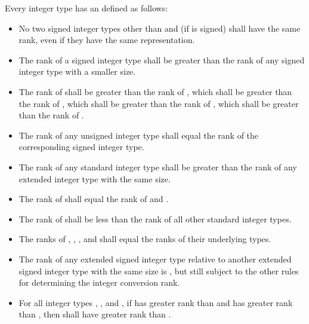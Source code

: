 \pnum
Every integer type has an  defined as follows:

\begin{itemize}
\item No two signed integer types other than  and  (if  is signed) shall have the same rank, even if they have
the same representation.

\item The rank of a signed integer type shall be greater than the rank
of any signed integer type with a smaller size.

\item The rank of  shall be greater
than the rank of , which shall be greater than
the rank of , which shall be greater than the rank of
, which shall be greater than the rank of
.

\item The rank of any unsigned integer type shall equal the rank of the
corresponding signed integer type.

\item The rank of any standard integer type shall be greater than the
rank of any extended integer type with the same size.

\item The rank of  shall equal the rank of 
and .

\item The rank of  shall be less than the rank of all other
standard integer types.

%
%
%
\item The ranks of , , , and
 shall equal the ranks of their underlying
types.

\item The rank of any extended signed integer type relative to another
extended signed integer type with the same size is , but still subject to the other rules for determining the integer
conversion rank.

\item For all integer types , , and , if
 has greater rank than  and  has greater
rank than , then  shall have greater rank than
.
\end{itemize}

